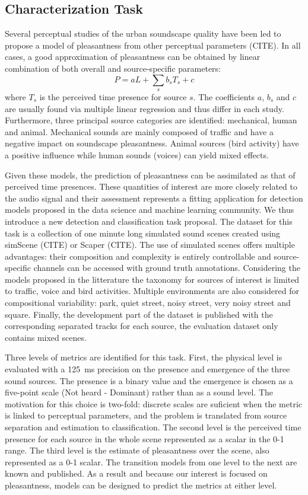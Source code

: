 \documentclass{article}
\begin{document}
\begin{sloppy}
\section{Characterization Task}
\label{sec:char}
Several perceptual studies of the urban soundscape quality have been led to propose a model of pleasantness from other perceptual parameters (CITE). In all cases, a good approximation of pleasantness can be obtained by linear combination of both overall and source-specific parameters: 
\begin{equation}
P = aL + \sum_s b_sT_s + c
\end{equation}
where $T_s$ is the perceived time presence for source $s$. The coefficients $a$, $b_s$ and $c$ are usually found via multiple linear regression and thus differ in each study.
Furthermore, three principal source categories are identified: mechanical, human and animal. Mechanical sounds are mainly composed of traffic and have a negative impact on soundscape pleasantness. Animal sources (bird activity) have a positive influence while human sounds (voices) can yield mixed effects.

Given these models, the prediction of pleasantness can be assimilated as that of perceived time presences. These quantities of interest are more closely related to the audio signal and their assessment represents a fitting application for detection models proposed in the data science and machine learning community. We thus introduce a new detection and classification task proposal. The dataset for this task is a collection of one minute long simulated sound scenes created using simScene (CITE) or Scaper (CITE). The use of simulated scenes offers multiple advantages: their composition and complexity is entirely controllable and source-specific channels can be accessed with ground truth annotations. Considering the models proposed in the litterature the taxonomy for sources of interest is limited to traffic, voice and bird activities. Multiple environments are also considered for compositional variability: park, quiet street, noisy street, very noisy street and square. Finally, the development part of the dataset is published with the corresponding separated tracks for each source, the evaluation dataset only contains mixed scenes.

Three levels of metrics are identified for this task. First, the physical level is evaluated with a 125~ms precision on the presence and emergence of the three sound sources. The presence is a binary value and the emergence is chosen as a five-point scale (Not heard - Dominant) rather than as a sound level. The motivation for this choice is two-fold: discrete scales are suficient when the metric is linked to perceptual parameters, and the problem is translated from source separation and estimation to classification. The second level is the perceived time presence for each source in the whole scene represented as a scalar in the 0-1 range. The third level is the estimate of pleasantness over the scene, also represented as a 0-1 scalar. The transition models from one level to the next are known and published. As a result and because our interest is focused on pleasantness, models can be designed to predict the metrics at either level.


\end{sloppy}
\end{document}
